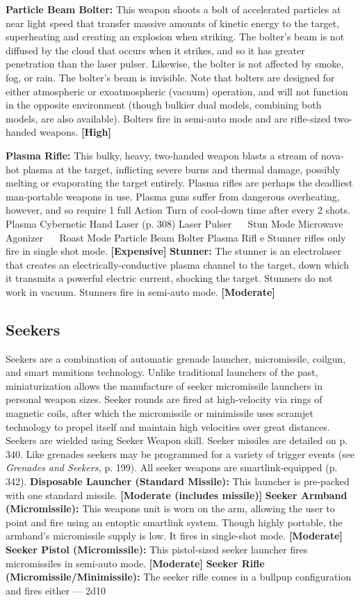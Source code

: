 \textbf{Particle Beam Bolter:} This weapon shoots a bolt of 
accelerated particles at near light speed that transfer 
massive amounts of kinetic energy to the target, superheating
and creating an explosion when striking.
The bolter's beam is not diffused by the cloud that 
occurs when it strikes, and so it has greater penetration
than the laser pulser. Likewise, the bolter is not
affected by smoke, fog, or rain. The bolter's beam is 
invisible. Note that bolters are designed for either 
atmospheric or exoatmospheric (vacuum) operation, 
and will not function in the opposite environment 
(though bulkier dual models, combining both models, 
are also available). Bolters fire in semi-auto mode and 
are rifle-sized two-handed weapons. \textbf{[High]}

\textbf{Plasma Rifle:} This bulky, heavy, two-handed 
weapon blasts a stream of nova-hot plasma at the 
target, inflicting severe burns and thermal damage, 
possibly melting or evaporating the target entirely. 
Plasma rifles are perhaps the deadliest man-portable 
weapons in use. Plasma guns suffer from dangerous 
overheating, however, and so require 1 full Action 
Turn of cool-down time after every 2 shots. Plasma 
Cybernetic Hand Laser (p. 308)
Laser Pulser
   Stun Mode
Microwave Agonizer
   Roast Mode
Particle Beam Bolter
Plasma Riﬂ e
Stunner
rifles only fire in single shot mode. \textbf{[Expensive]}
\textbf{Stunner:} The stunner is an electrolaser that creates
an electrically-conductive plasma channel to the
target, down which it transmits a powerful electric 
current, shocking the target. Stunners do not work in 
vacuum. Stunners fire in semi-auto mode. \textbf{[Moderate]}

\subsection{Seekers}

Seekers are a combination of automatic grenade 
launcher, micromissile, coilgun, and smart munitions 
technology. Unlike traditional launchers of the past, 
miniaturization allows the manufacture of seeker micromissile
launchers in personal weapon sizes. Seeker
rounds are fired at high-velocity via rings of magnetic 
coils, after which the micromissile or minimissile uses 
scramjet technology to propel itself and maintain high 
velocities over great distances. Seekers are wielded 
using Seeker Weapon skill.
Seeker missiles are detailed on p. 340. Like grenades
seekers may be programmed for a variety of
trigger events (see \textit{Grenades and Seekers,} p. 199). All 
seeker weapons are smartlink-equipped (p. 342).
\textbf{Disposable Launcher (Standard Missile):} This 
launcher is pre-packed with one standard missile. 
\textbf{[Moderate (includes missile)]}
\textbf{Seeker Armband (Micromissile):} This weapons unit 
is worn on the arm, allowing the user to point and 
fire using an entoptic smartlink system. Though highly 
portable, the armband's micromissile supply is low. It 
fires in single-shot mode. \textbf{[Moderate]}
\textbf{Seeker Pistol (Micromissile):} This pistol-sized 
seeker launcher fires micromissiles in semi-auto 
mode. \textbf{[Moderate]}
\textbf{Seeker Rifle (Micromissile/Minimissile):} The seeker 
rifle comes in a bullpup configuration and fires either 
—
2d10

